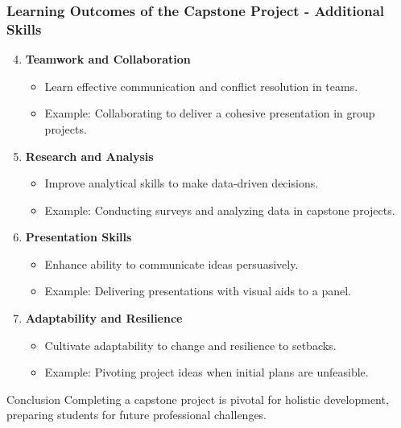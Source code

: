 \documentclass{beamer}
\begin{document}
\begin{frame}[fragile]
    \frametitle{Learning Outcomes of the Capstone Project - Additional Skills}
    \begin{enumerate}
        \setcounter{enumi}{3}
        \item \textbf{Teamwork and Collaboration}
            \begin{itemize}
                \item Learn effective communication and conflict resolution in teams.
                \item Example: Collaborating to deliver a cohesive presentation in group projects.
            \end{itemize}

        \item \textbf{Research and Analysis}
            \begin{itemize}
                \item Improve analytical skills to make data-driven decisions.
                \item Example: Conducting surveys and analyzing data in capstone projects.
            \end{itemize}

        \item \textbf{Presentation Skills}
            \begin{itemize}
                \item Enhance ability to communicate ideas persuasively.
                \item Example: Delivering presentations with visual aids to a panel.
            \end{itemize}

        \item \textbf{Adaptability and Resilience}
            \begin{itemize}
                \item Cultivate adaptability to change and resilience to setbacks.
                \item Example: Pivoting project ideas when initial plans are unfeasible.
            \end{itemize}
    \end{enumerate}

    \begin{block}{Conclusion}
        Completing a capstone project is pivotal for holistic development, preparing students for future professional challenges.
    \end{block}
\end{frame}
\end{document}
